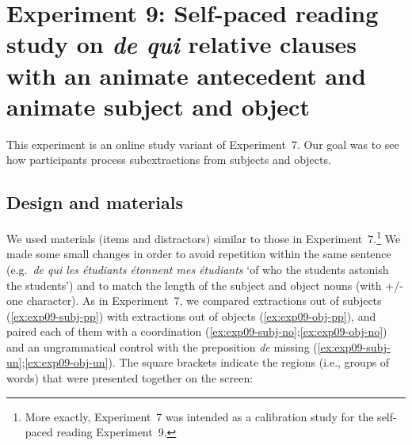 \section[head=Experiment 9]{Experiment 9: Self-paced reading study on \emph{de qui} relative clauses with an animate antecedent and animate subject and object}
\label{ch:exp09}

This experiment is an online study variant of Experiment~7. Our goal was to see how participants process subextractions from subjects and objects. 

\subsection{Design and materials}

We used materials (items and distractors) similar to those in Experiment~7.\footnote{More exactly, Experiment~7 was intended as a calibration study for the self-paced reading Experiment~9.} We made some small changes in order to avoid repetition within the same sentence (e.g.\ \emph{de qui les étudiants étonnent mes étudiants} `of who the students astonish the students') and to match the length of the subject and object nouns (with +/- one character). As in Experiment~7, we compared extractions out of subjects (\ref{ex:exp09-subj-pp}) with extractions out of objects (\ref{ex:exp09-obj-pp}), and paired each of them with a coordination (\ref{ex:exp09-subj-no};\ref{ex:exp09-obj-no}) and an ungrammatical control with the preposition \emph{de} missing (\ref{ex:exp09-subj-un};\ref{ex:exp09-obj-un}). The square brackets indicate the regions (i.e., groups of words) that were presented together on the screen:

